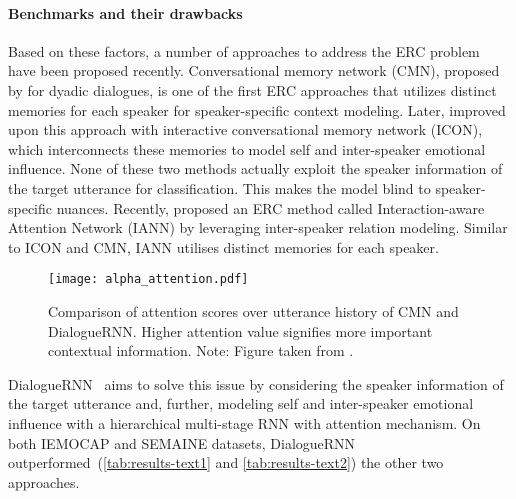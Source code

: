 \documentclass{IEEEtran}\usepackage[pdftex]{graphicx}
\begin{document}
	\paragraph{Benchmarks and their drawbacks}
	Based on these factors, a number of approaches to address the ERC problem have been proposed recently. Conversational memory network (CMN), proposed by  \citet{hazarika2018conversational} for dyadic dialogues, is one of the first ERC approaches that utilizes distinct memories for each speaker for speaker-specific context modeling. Later, \citet{hazarika2018icon} improved upon this approach with interactive conversational memory network (ICON), which interconnects these memories to model self and inter-speaker emotional influence. None of these two methods actually exploit the speaker information of the target utterance for classification. This makes the model blind to speaker-specific nuances. Recently, \citet{yeh2019interaction} proposed an ERC method called Interaction-aware Attention Network (IANN) by leveraging inter-speaker relation modeling. Similar to ICON and CMN, IANN utilises distinct memories for each speaker.  
	\begin{figure*}[h]
		\centering
		\texttt{[image: alpha\_attention.pdf]}
		\caption{Comparison of attention scores over utterance history of CMN and DialogueRNN. Higher attention value signifies more important contextual information. Note: Figure taken from \citet{majumder2019dialoguernn}.}
		\label{fig:case-study}
	\end{figure*}
	DialogueRNN~\citep{majumder2019dialoguernn} aims to solve this issue by considering the speaker information of the target utterance and, further, modeling self and inter-speaker emotional influence with a hierarchical multi-stage RNN with attention mechanism. On both IEMOCAP and SEMAINE datasets, DialogueRNN outperformed~(\cref{tab:results-text1} and \cref{tab:results-text2}) the other two approaches.
	
\end{document}
